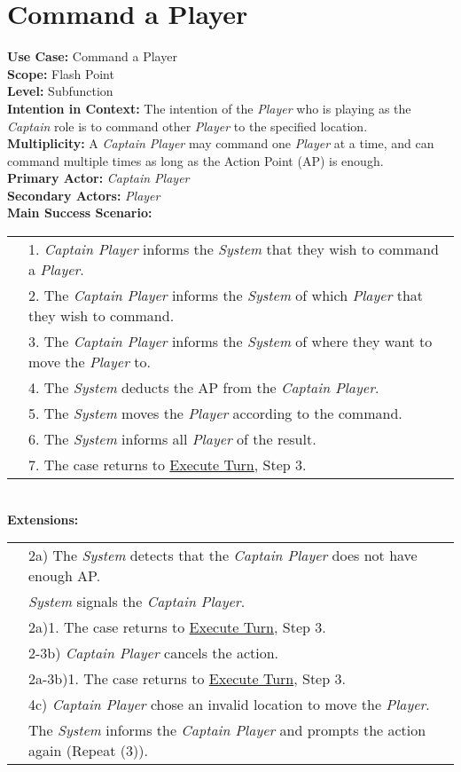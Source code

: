 \documentclass{article}
\begin{document}
	\section*{Command a Player}
	\textbf{Use Case:} Command a Player\\
	\textbf{Scope:} Flash Point\\
	\textbf{Level:} Subfunction\\
	\textbf{Intention in Context:} The intention of the \textit{Player} who is playing as the \textit{Captain} role is to command other \textit{Player} to the specified location.\\
	\textbf{Multiplicity: }A \textit{Captain Player} may command one \textit{Player} at a time, and can command multiple times as long as the Action Point (AP) is enough.\\
	\textbf{Primary Actor:} \textit{Captain Player}\\
	\textbf{Secondary Actors:} \textit{Player}\\
	\textbf{Main Success Scenario:}\\
	\begin{tabular}{l l}
		&1. \textit{Captain Player} informs the \textit{System} that they wish to command a \textit{Player}.\\
		&2. The \textit{Captain Player} informs the \textit{System} of which \textit{Player} that they wish to command.\\
		&3. The \textit{Captain Player} informs the \textit{System} of where they want to move the \textit{Player} to.\\
		&4. The \textit{System} deducts the AP from the \textit{Captain Player}.\\
		&5. The \textit{System} moves the \textit{Player} according to the command.\\
		&6. The \textit{System} informs all \textit{Player} of the result.\\
		&7. The case returns to \underline{Execute Turn}, Step 3.
	\end{tabular}\\
	\textbf{Extensions:}\\
	\begin{tabular}{l l}
		&2a) The \textit{System} detects that the \textit{Captain Player} does not have enough AP.\\ &\qquad\textit{System} signals the \textit{Captain Player}.\\
		&\qquad2a)1. The case returns to \underline{Execute Turn}, Step 3.\\
		&2-3b) \textit{Captain Player} cancels the action.\\
		&\qquad2a-3b)1. The case returns to \underline{Execute Turn}, Step 3.\\
		&4c) \textit{Captain Player} chose an invalid location to move the \textit{Player}.\\
		&\qquad The \textit{System} informs the \textit{Captain Player} and prompts the action again (Repeat (3)).
	\end{tabular}\\
	
\end{document}
